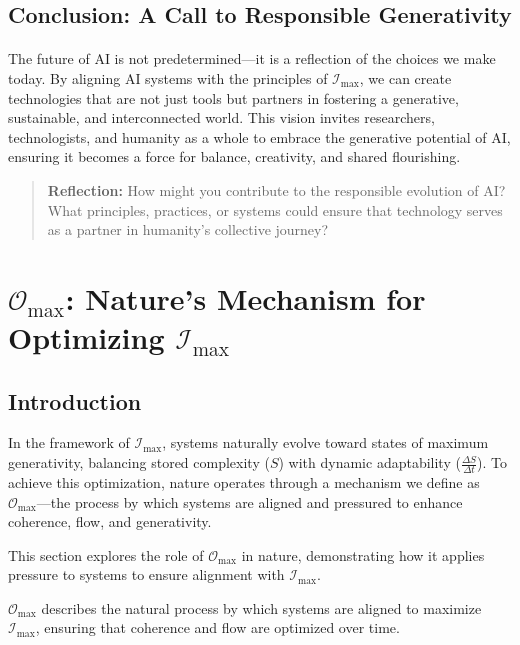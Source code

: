 \documentclass[12pt]{article}
\begin{document}
\subsection{Conclusion: A Call to Responsible Generativity}
\paragraph{}
The future of AI is not predetermined—it is a reflection of the choices we make today. By aligning AI systems with the principles of \(\mathcal{I}_{\text{max}}\), we can create technologies that are not just tools but partners in fostering a generative, sustainable, and interconnected world. This vision invites researchers, technologists, and humanity as a whole to embrace the generative potential of AI, ensuring it becomes a force for balance, creativity, and shared flourishing.

\begin{quote}
\textbf{Reflection:}  
How might you contribute to the responsible evolution of AI? What principles, practices, or systems could ensure that technology serves as a partner in humanity’s collective journey?
\end{quote}


\section{\( \mathcal{O}_{\text{max}} \): Nature’s Mechanism for Optimizing \( \mathcal{I}_{\text{max}} \)}

\subsection{Introduction}
In the framework of \( \mathcal{I}_{\text{max}} \), systems naturally evolve toward states of maximum generativity, balancing stored complexity (\( S \)) with dynamic adaptability (\( \frac{\Delta S}{\Delta t} \)). To achieve this optimization, nature operates through a mechanism we define as \( \mathcal{O}_{\text{max}} \)—the process by which systems are aligned and pressured to enhance coherence, flow, and generativity.

This section explores the role of \( \mathcal{O}_{\text{max}} \) in nature, demonstrating how it applies pressure to systems to ensure alignment with \( \mathcal{I}_{\text{max}} \).

\( \mathcal{O}_{\text{max}} \) describes the natural process by which systems are aligned to maximize \( \mathcal{I}_{\text{max}} \), ensuring that coherence and flow are optimized over time.
\end{document}

